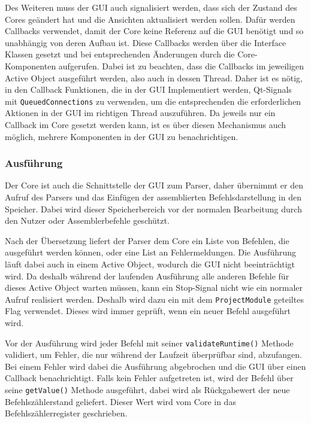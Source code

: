 Des Weiteren muss der GUI auch signalisiert werden, dass sich der Zustand des
Cores geändert hat und die Ansichten aktualisiert werden sollen. Dafür werden
Callbacks verwendet, damit der Core keine Referenz auf die GUI benötigt und so
unabhängig von deren Aufbau ist. Diese Callbacks werden über die Interface
Klassen gesetzt und bei entsprechenden Änderungen durch die Core-Komponenten
aufgerufen. Dabei ist zu beachten, dass die Callbacks im jeweiligen Active
Object ausgeführt werden, also auch in dessen Thread. Daher ist es nötig, in den
Callback Funktionen, die in der GUI Implementiert werden, Qt-Signals mit
\texttt{QueuedConnections} zu verwenden, um die entsprechenden die
erforderlichen Aktionen in der GUI im richtigen Thread auszuführen. Da jeweils
nur ein Callback im Core gesetzt werden kann, ist es über diesen Mechanismus
auch möglich, mehrere Komponenten in der GUI zu benachrichtigen.

\subsubsection{Ausführung}

Der Core ist auch die Schnittstelle der GUI zum Parser, daher übernimmt er den
Aufruf des Parsers und das Einfügen der assemblierten Befehlsdarstellung in den
Speicher. Dabei wird dieser Speicherbereich vor der normalen Bearbeitung durch
den Nutzer oder Assemblerbefehle geschützt.

Nach der Übersetzung liefert der Parser dem Core ein Liste von Befehlen, die
ausgeführt werden können, oder eine List an Fehlermeldungen. Die Ausführung
läuft dabei auch in einem Active Object, wodurch die GUI nicht beeinträchtigt
wird. Da deshalb während der laufenden Ausführung alle anderen Befehle für
dieses Active Object warten müssen, kann ein Stop-Signal nicht wie ein normaler
Aufruf realisiert werden. Deshalb wird dazu ein mit dem \texttt{ProjectModule}
geteiltes Flag verwendet. Dieses wird immer geprüft, wenn ein neuer Befehl
ausgeführt wird.

\pagebreak
Vor der Ausführung wird jeder Befehl mit seiner \texttt{validateRuntime()}
Methode validiert, um Fehler, die nur während der Laufzeit überprüfbar sind,
abzufangen. Bei einem Fehler wird dabei die Ausführung abgebrochen und die GUI
über einen Callback benachrichtigt. Falls kein Fehler aufgetreten ist, wird der
Befehl über seine \texttt{getValue()} Methode ausgeführt, dabei wird als
Rückgabewert der neue Befehlszählerstand geliefert. Dieser Wert wird vom Core in
das Befehlszählerregister geschrieben.

